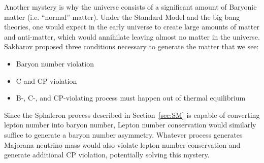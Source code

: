 \documentclass[/main.tex]{subfiles}
\begin{document}
Another mystery is why the universe consists of a significant amount of Baryonic matter (i.e. ``normal'' matter).
Under the Standard Model and the big bang theories, one would expect in the early universe to create large amounts of matter and anti-matter, which would annihilate leaving almost no matter in the universe.
Sakharov proposed three conditions necessary to generate the matter that we see\cite{Sakharov1967}:
\begin{itemize}
\item Baryon number violation
\item C and CP violation
\item B-, C-, and CP-violating process must happen out of thermal equilibrium
\end{itemize}
Since the Sphaleron process described in Section~\ref{sec:SM} is capable of converting lepton number into baryon number, Lepton number conservation would similarly suffice to generate a baryon number asymmetry.
Whatever process generates Majorana neutrino mass would also violate lepton number conservation and generate additional CP violation, potentially solving this mystery.
\end{document}
